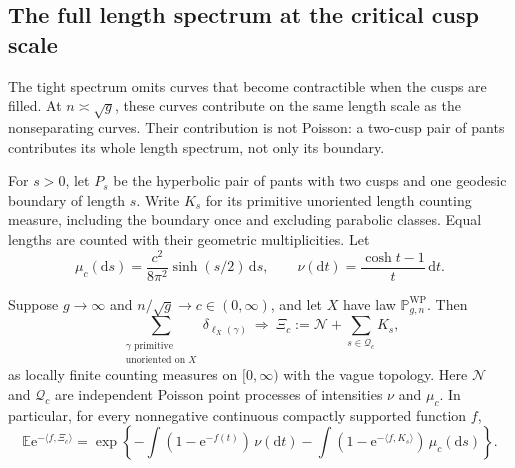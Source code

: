 \subsection{The full length spectrum at the critical cusp scale}
\label{sec:critical-cluster}

The tight spectrum omits curves that become contractible when the cusps
are filled. At $n\asymp\sqrt g$, these curves contribute on the same
length scale as the nonseparating curves. Their contribution is not
Poisson: a two-cusp pair of pants contributes its whole length spectrum,
not only its boundary.

For $s>0$, let $P_s$ be the hyperbolic pair of pants with two cusps and
one geodesic boundary of length $s$. Write $K_s$ for its primitive
unoriented length counting measure, including the boundary once and
excluding parabolic classes. Equal lengths are counted with their
geometric multiplicities. Let
\begin{equation}
 \mu_c(\mathrm ds)=\frac{c^2}{8\pi^2}\sinh(s/2)\,\mathrm ds,
 \qquad \nu(\mathrm dt)=\frac{\cosh t-1}{t}\,\mathrm dt.
 \label{eq:cluster-intensities}
\end{equation}

\begin{theorem}
\label{thm:critical-cluster}
Suppose $g\to\infty$ and $n/\sqrt g\to c\in(0,\infty)$, and let
$X$ have law $\mathbb P^{\mathrm{WP}}_{g,n}$. Then
\begin{equation}
 \sum_{\substack{\gamma\text{ primitive}\\\text{unoriented on }X}}
       \delta_{\ell_X(\gamma)}
 \ \Longrightarrow\ \Xi_c:=\mathcal N+\sum_{s\in\mathcal Q_c}K_s,
 \label{eq:critical-cluster}
\end{equation}
as locally finite counting measures on $[0,\infty)$ with the vague
topology. Here $\mathcal N$ and $\mathcal Q_c$ are independent Poisson
point processes of intensities $\nu$ and $\mu_c$. In particular, for
every nonnegative continuous compactly supported function $f$,
\begin{equation}
 \mathbb E\mathrm e^{-\langle f,\Xi_c\rangle}
 =\exp\left\{-\int(1-\mathrm e^{-f(t)})\,\nu(\mathrm dt)
 -\int(1-\mathrm e^{-\langle f,K_s\rangle})\,\mu_c(\mathrm ds)\right\}.
 \label{eq:cluster-laplace}
\end{equation}
\end{theorem}

